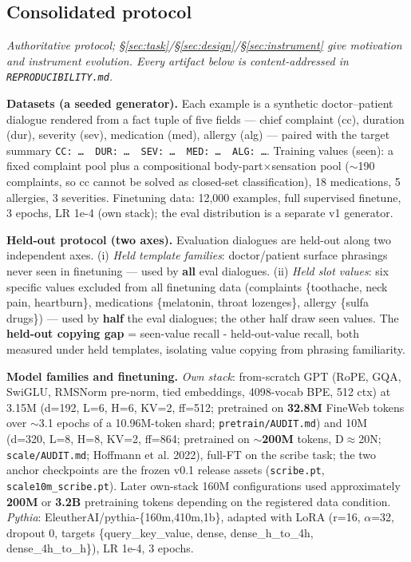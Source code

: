 \documentclass[11pt]{article}
\begin{document}
\subsection{Consolidated protocol}\label{sec:methods}

\emph{Authoritative protocol; \S\ref{sec:task}/\S\ref{sec:design}/\S\ref{sec:instrument} give motivation and instrument evolution. Every artifact below is content-addressed in \texttt{REPRODUCIBILITY.md}.}

\textbf{Datasets (a seeded generator).} Each example is a synthetic doctor--patient dialogue rendered from a fact tuple of five fields --- chief complaint (cc), duration (dur), severity (sev), medication (med), allergy (alg) --- paired with the target summary \texttt{CC:\ …\ \textbar{}\ DUR:\ …\ \textbar{}\ SEV:\ …\ \textbar{}\ MED:\ …\ \textbar{}\ ALG:\ …}. Training values (seen): a fixed complaint pool plus a compositional body-part$\times$sensation pool ($\sim$190 complaints, so cc cannot be solved as closed-set classification), 18 medications, 5 allergies, 3 severities. Finetuning data: 12,000 examples, full supervised finetune, 3 epochs, LR 1e-4 (own stack); the eval distribution is a separate v1 generator.

\textbf{Held-out protocol (two axes).} Evaluation dialogues are held-out along two independent axes. (i) \emph{Held template families}: doctor/patient surface phrasings never seen in finetuning --- used by \textbf{all} eval dialogues. (ii) \emph{Held slot values}: six specific values excluded from all finetuning data (complaints \{toothache, neck pain, heartburn\}, medications \{melatonin, throat lozenges\}, allergy \{sulfa drugs\}) --- used by \textbf{half} the eval dialogues; the other half draw seen values. The \textbf{held-out copying gap} = seen-value recall - held-out-value recall, both measured under held templates, isolating value copying from phrasing familiarity.

\textbf{Model families and finetuning.} \emph{Own stack}: from-scratch GPT (RoPE, GQA, SwiGLU, RMSNorm pre-norm, tied embeddings, 4098-vocab BPE, 512 ctx) at 3.15M (d=192, L=6, H=6, KV=2, ff=512; pretrained on \textbf{32.8M} FineWeb tokens over $\sim$3.1 epochs of a 10.96M-token shard; \texttt{pretrain/AUDIT.md}) and 10M (d=320, L=8, H=8, KV=2, ff=864; pretrained on $\sim$\textbf{200M} tokens, D$\approx$20N; \texttt{scale/AUDIT.md}; {Hoffmann et al.} 2022), full-FT on the scribe task; the two anchor checkpoints are the frozen v0.1 release assets (\texttt{scribe.pt}, \texttt{scale10m\_scribe.pt}). Later own-stack 160M configurations used approximately \textbf{200M} or \textbf{3.2B} pretraining tokens depending on the registered data condition. \emph{Pythia}: EleutherAI/pythia-\{160m,410m,1b\}, adapted with LoRA (r=16, $\alpha$=32, dropout 0, targets \{query\_key\_value, dense, dense\_h\_to\_4h, dense\_4h\_to\_h\}), LR 1e-4, 3 epochs.
\end{document}
